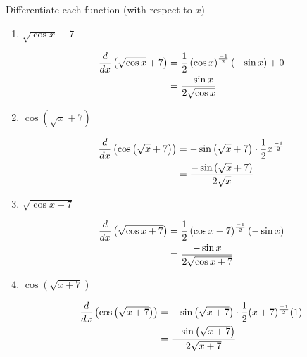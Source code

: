 \documentclass[handout,nooutcomes]{ximera}
\begin{document}
\begin{problem}
Differentiate each function (with respect to $x$)

	\begin{enumerate}
	
	\item $\sqrt{\cos x} + 7$
		\begin{freeResponse}
		\begin{align*}
		\frac{d}{dx} \left( \sqrt{\cos x} + 7 \right) &=  \frac{1}{2} \left( \cos x \right)^{\frac{-1}{2}} \left( -\sin x \right) + 0  \\
		&= \frac{- \sin x}{2 \sqrt{\cos x}}
		\end{align*}
		\end{freeResponse}
		
		
		
	\item  $\cos \left( \sqrt{x} + 7 \right)$
		\begin{freeResponse}
		\begin{align*}
		\frac{d}{dx} \left( \cos \left( \sqrt{x} + 7 \right) \right) &= - \sin \left( \sqrt{x} + 7 \right) \cdot \frac{1}{2} x^{\frac{-1}{2}} \\
		&=  \frac{- \sin \left( \sqrt{x} + 7 \right) }{2 \sqrt{x}}
		\end{align*}
		\end{freeResponse}
	
	
	
	\item  $\sqrt{ \cos x + 7}$
		\begin{freeResponse}
		\begin{align*}
		\frac{d}{dx} \left( \sqrt{ \cos x + 7} \right) &= \frac{1}{2} \left( \cos x + 7 \right)^{\frac{-1}{2}} \left( -\sin x \right) \\
		&= \frac{- \sin x }{2 \sqrt{\cos x + 7 }}
		\end{align*}
		\end{freeResponse}
		
		
		
		
	\item  $\cos \left( \sqrt{x+7} \right) $
		\begin{freeResponse}
		\begin{align*}
		\frac{d}{dx} \left( \cos \left( \sqrt{x+7} \right) \right) &= -\sin \left( \sqrt{x+7} \right) \cdot \frac{1}{2} (x+7)^{\frac{-1}{2}} (1) \\
		&= \frac{-\sin \left( \sqrt{x+7} \right) }{2 \sqrt{x+7}}
		\end{align*}
		\end{freeResponse}
		
		
		
		
		
	\end{enumerate}
			
			
	
\end{problem}
\end{document}
